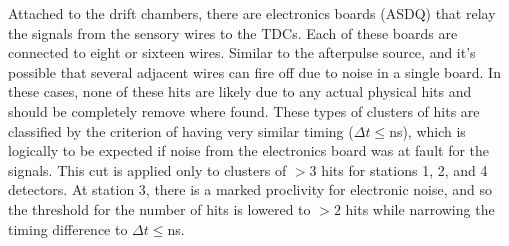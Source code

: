 Attached to the drift chambers, there are electronics boards (ASDQ) that relay the signals from the sensory wires to the TDCs. Each of these boards are connected to eight or sixteen wires. Similar to the afterpulse source, and it's possible that several adjacent wires can fire off due to noise in a single board. In these cases, none of these hits are likely due to any actual physical hits and should be completely remove where found.  These types of clusters of hits are classified by the criterion of having very similar timing ($\Delta t \leq $\unit[10]{ns}), which is logically to be expected if noise from the electronics board was at fault for the signals. This cut is applied only to clusters of $>3$ hits for stations 1, 2, and 4 detectors. At station 3, there is a marked proclivity for electronic noise, and so the threshold for the number of hits is lowered to $>2$ hits while narrowing the timing difference to $\Delta t \leq$\unit[8]{ns}.

